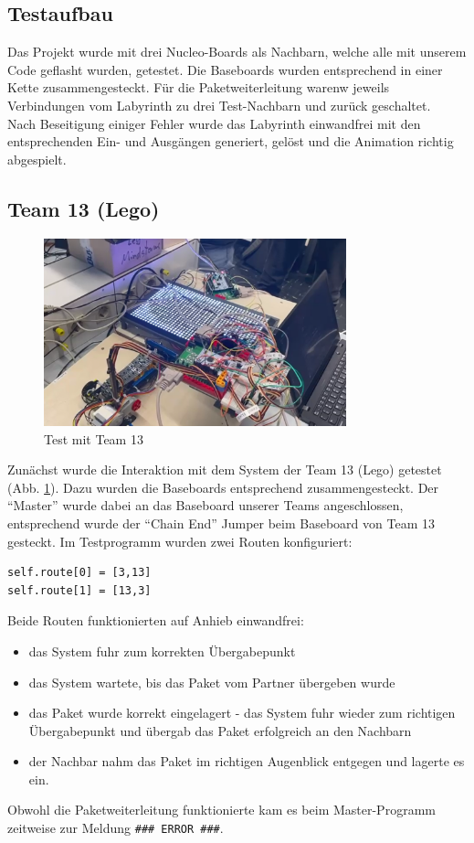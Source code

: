 \subsection{Testaufbau}
Das Projekt wurde mit drei Nucleo-Boards als Nachbarn, welche alle mit unserem Code geflasht wurden, getestet. Die Baseboards wurden entsprechend in einer Kette zusammengesteckt. Für die Paketweiterleitung warenw jeweils Verbindungen vom Labyrinth zu drei Test-Nachbarn und zurück geschaltet. \\
Nach Beseitigung einiger Fehler wurde das Labyrinth einwandfrei mit den entsprechenden Ein- und Ausgängen generiert, gelöst und die Animation richtig abgespielt.

\subsection{Team 13 (Lego)}

\begin{figure}[H]
    \centering
    \includegraphics[page=1,width=0.78\textwidth]{images/Test_Team_13_cropped.PNG} 
    \caption{Test mit Team 13}
    \label{fig:Test_Team_13}
\end{figure}

Zunächst wurde die Interaktion mit dem System der Team 13 (Lego) getestet (Abb. \ref{fig:Test_Team_13}). Dazu wurden die Baseboards entsprechend zusammengesteckt. Der \enquote{Master} wurde dabei an das Baseboard unserer Teams angeschlossen, entsprechend wurde der \enquote{Chain End} Jumper beim Baseboard von Team 13 gesteckt. Im Testprogramm wurden zwei Routen konfiguriert:

\begin{lstlisting}[style=CBlank]
self.route[0] = [3,13] 
self.route[1] = [13,3]
\end{lstlisting}

\noindent Beide Routen funktionierten auf Anhieb einwandfrei:
\begin{itemize}
    \item das System fuhr zum korrekten Übergabepunkt
    \item das System wartete, bis das Paket vom Partner übergeben wurde
    \item das Paket wurde korrekt eingelagert - das System fuhr wieder zum richtigen Übergabepunkt und übergab das Paket erfolgreich an den Nachbarn
    \item der Nachbar nahm das Paket im richtigen Augenblick entgegen und lagerte es ein.
\end{itemize}
Obwohl die Paketweiterleitung funktionierte kam es beim Master-Programm zeitweise zur Meldung \texttt{\#\#\# ERROR \#\#\#}.

